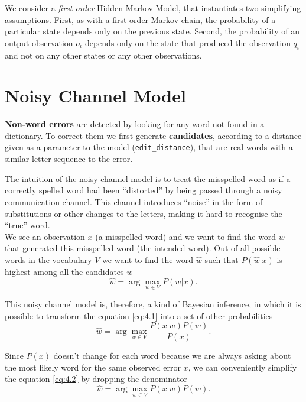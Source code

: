 We consider a \textit{first-order} Hidden Markov Model, that instantiates two simplifying assumptions. First, as with a 
first-order Markov chain, the probability of a particular state depends only on the previous state. Second, the probability 
of an output observation $o_i$ depends only on the state that produced the observation $q_i$ and not on any other states 
or any other observations.


\section{Noisy Channel Model}
\textbf{Non-word errors} are detected by looking for any word not found in a dictionary. To correct them we first 
generate \textbf{candidates}, according to a distance given as a parameter to the model (\texttt{edit\_distance}), 
that are 
real words with a similar letter sequence to the error. 

The intuition of the noisy channel model is to treat the misspelled word as if a correctly spelled word had 
been “distorted” by being passed through a noisy communication channel. 
This channel introduces “noise” in the form of substitutions or other changes to the letters, making it hard to 
recognise 
the “true” word. \\

We see an observation $x$ (a misspelled word) and we want to find the word $w$ that generated this misspelled 
word 
(the intended word).
Out of all possible words in the vocabulary $V$ we want to find the word $\hat{w}$ such that $P(\hat{w}|x)$ is 
highest 
among all the candidates $w$
\begin{equation}\label{eq:4.1}
	\hat{w} = \arg\max_{w \in V} P(w|x) \mbox{.}
\end{equation}

This noisy channel model is, therefore, a kind of Bayesian inference, in which it is possible to transform the 
equation 
\ref{eq:4.1} into a set of other probabilities
\begin{equation}\label{eq:4.2}
\hat{w} = \arg\max_{w \in V} \frac{P(x|w)P(w)}{P(x)} \mbox{.}
\end{equation}

Since $P(x)$ doesn’t change for each word because we are always asking about the most likely word for the same 
observed error $x$, we can conveniently simplify the equation \ref{eq:4.2} by dropping the denominator
\begin{equation}\label{eq:4.3}
\hat{w} = \arg\max_{w \in V} {P(x|w)P(w)} \mbox{.}
\end{equation}

